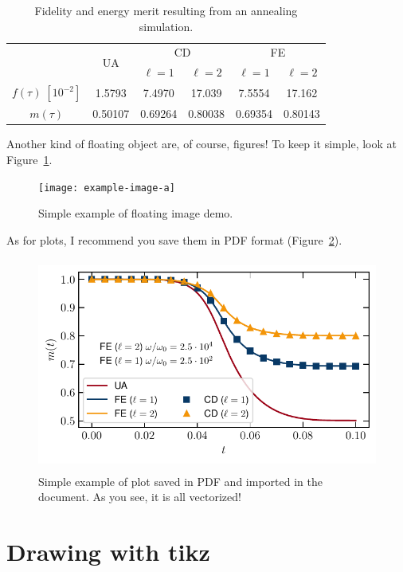 \begin{table}[h]
\centering
\begin{tabular}{c|c|cc|cc}
    &\multirow{2}{*}{UA}&\multicolumn{2}{c|}{CD}&\multicolumn{2}{c}{FE}\\
    &&$\ell=1$&$\ell=2$&$\ell=1$&$\ell=2$\\\hline
    $f(\tau) \;[10^{-2}]$&1.5793&7.4970&17.039&7.5554&17.162\\
    $m(\tau)$&0.50107&0.69264&0.80038&0.69354&0.80143\\
    \hline
\end{tabular}
\caption{\label{tab:demo}Fidelity and energy merit resulting from an annealing simulation.}
\end{table}



Another kind of floating object are, of course, figures! To keep it simple, look at Figure~\ref{fig:demo}.\\

\begin{figure}
    \centering
    \texttt{[image: example-image-a]}
    \caption{Simple example of floating image demo.}
    \label{fig:demo}
\end{figure}


As for plots, I recommend you save them in PDF format (Figure~\ref{fig:demo-plot}).

\begin{figure}
    \centering
    \includegraphics[height=7cm]{img/demo-plot.pdf}
    \caption{Simple example of plot saved in PDF and imported in the document. As you see, it is all vectorized!}
    \label{fig:demo-plot}
\end{figure}


\lipsum[1-5]






\section{Drawing with tikz}

